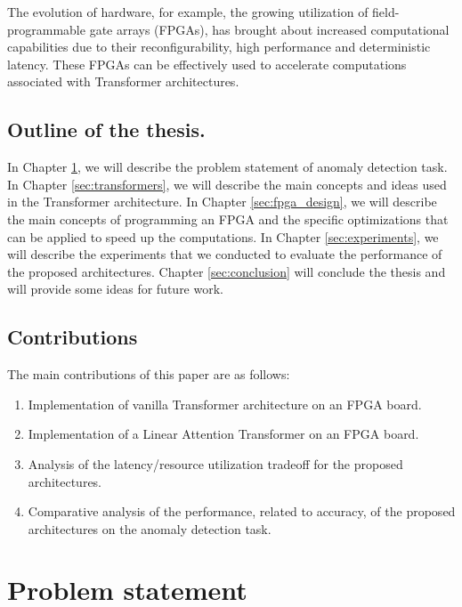 \documentclass[a4paper, twoside]{report}
\theoremstyle{definition}
\numberwithin{equation}{section}
\begin{document}
The evolution of hardware, for example, the growing utilization of
field-programmable gate arrays (FPGAs), has brought about increased computational capabilities
due to their reconfigurability, high performance and deterministic latency. These FPGAs can be
effectively used to accelerate computations associated with Transformer
architectures.


\section*{Outline of the thesis.}

In Chapter \ref{sec:problem_statement}, we will describe the problem statement of anomaly detection task.
In Chapter \ref{sec:transformers}, we will describe the main concepts and ideas used in the Transformer architecture.
In Chapter \ref{sec:fpga_design}, we will describe the main concepts of programming an FPGA and the specific optimizations that can be applied to speed up the computations.
In Chapter \ref{sec:experiments}, we will describe the experiments that we conducted to evaluate the performance of the proposed architectures.
Chapter \ref{sec:conclusion} will conclude the thesis and will provide some ideas for future work.


\section*{Contributions}

The main contributions of this paper are as follows:
\begin{enumerate}
    \item Implementation of vanilla Transformer architecture on an FPGA board.
    \item Implementation of a Linear Attention Transformer on an FPGA board.
    \item Analysis of the latency/resource utilization tradeoff for the proposed architectures.
    \item Comparative analysis of the performance, related to accuracy, of the proposed architectures on the anomaly detection task.
\end{enumerate}



\chapter{Problem statement} \label{sec:problem_statement}
\end{document}
